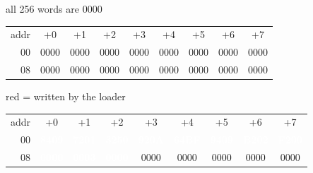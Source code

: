 \noindent\begin{tcolorbox}[stepbox, title={RAM before loading}]
\textcolor{dim}{all 256 words are 0000}\\[1pt]
{\setlength{\tabcolsep}{1.6pt}\begin{tabular}{@{}r*{8}{c}@{}}
\textcolor{dim}{addr} & \textcolor{dim}{+0} & \textcolor{dim}{+1} & \textcolor{dim}{+2} & \textcolor{dim}{+3} & \textcolor{dim}{+4} & \textcolor{dim}{+5} & \textcolor{dim}{+6} & \textcolor{dim}{+7}\\
\textcolor{dim}{00} & 0000 & 0000 & 0000 & 0000 & 0000 & 0000 & 0000 & 0000\\
\textcolor{dim}{08} & 0000 & 0000 & 0000 & 0000 & 0000 & 0000 & 0000 & 0000\\
\end{tabular}}
\end{tcolorbox}\hfill\begin{tcolorbox}[stepbox, title={RAM after loading}]
\textcolor{dim}{red = written by the loader}\\[1pt]
{\setlength{\tabcolsep}{1.6pt}\begin{tabular}{@{}r*{8}{c}@{}}
\textcolor{dim}{addr} & \textcolor{dim}{+0} & \textcolor{dim}{+1} & \textcolor{dim}{+2} & \textcolor{dim}{+3} & \textcolor{dim}{+4} & \textcolor{dim}{+5} & \textcolor{dim}{+6} & \textcolor{dim}{+7}\\
\textcolor{dim}{00} & \cellcolor{wrt}\textcolor{white}{\textbf{8409}} & \cellcolor{wrt}\textcolor{white}{\textbf{7201}} & \cellcolor{wrt}\textcolor{white}{\textbf{3250}} & \cellcolor{wrt}\textcolor{white}{\textbf{920A}} & \cellcolor{wrt}\textcolor{white}{\textbf{64BF}} & \cellcolor{wrt}\textcolor{white}{\textbf{9409}} & \cellcolor{wrt}\textcolor{white}{\textbf{B202}} & \cellcolor{wrt}\textcolor{white}{\textbf{F200}}\\
\textcolor{dim}{08} & \cellcolor{wrt}\textcolor{white}{\textbf{0000}} & \cellcolor{wrt}\textcolor{white}{\textbf{0003}} & \cellcolor{wrt}\textcolor{white}{\textbf{0000}} & 0000 & 0000 & 0000 & 0000 & 0000\\
\end{tabular}}
\end{tcolorbox}\par\vspace{3pt}
